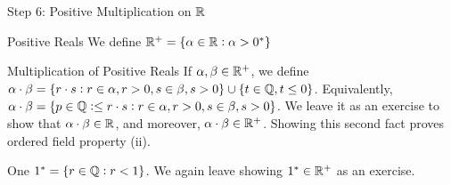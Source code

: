 \begin{nblank}{Step 6: Positive Multiplication on $\mathbb{R}$}
    \begin{ndef}{Positive Reals}
        We define $\mathbb{R}^+ = \set{\alpha \in \mathbb{R}: \alpha > 0^*}$
    \end{ndef}
    \begin{ndef}{Multiplication of Positive Reals}
        If $\alpha, \beta \in \mathbb{R}^+$, we define $\alpha \cdot \beta = \set{r \cdot s: r \in \alpha, r> 0, s \in \beta, s > 0} \cup \set{t \in \mathbb{Q}, t \leq 0}$. Equivalently, $\alpha \cdot \beta = \set{p \in \mathbb{Q}:  \leq r \cdot s: r \in \alpha, r > 0, s \in \beta, s > 0}$. We leave it as an exercise to show that $\alpha \cdot \beta \in \mathbb{R}$, and moreover, $\alpha \cdot \beta \in \mathbb{R}^+$. Showing this second fact proves ordered field property (ii).
    \end{ndef}
    \begin{ndef}{One}
        $1^* = \set{r \in \mathbb{Q}: r < 1}$. We again leave showing $1^* \in \mathbb{R}^+$ as an exercise. 
    \end{ndef}
\end{nblank}

